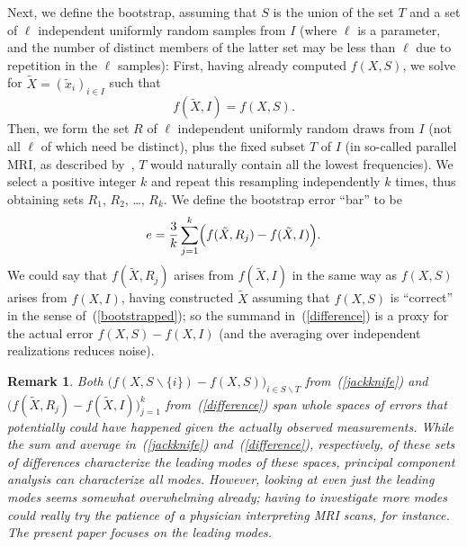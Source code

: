 \documentclass{article}
\newtheorem{remark1}[theorem]{Remark}
\newenvironment{remark}{\begin{remark1} \rm}{\end{remark1}}
\begin{document}
Next, we define the bootstrap, assuming that $S$ is the union of the set $T$
and a set of $\ell$ independent uniformly random samples from $I$
(where $\ell$ is a parameter, and the number of distinct members
of the latter set may be less than $\ell$ due to repetition
in the $\ell$ samples):
First, having already computed $f(X, S)$,
we solve for $\tilde{X} = (\tilde{x}_i)_{i \in I}$ such that
%
\begin{equation}
\label{bootstrapped}
f(\tilde{X}, I) = f(X, S).
\end{equation}
%
Then, we form the set $R$ of $\ell$ independent uniformly random draws from $I$
(not all $\ell$ of which need be distinct),
plus the fixed subset $T$ of $I$ (in so-called parallel MRI,
as described by~\cite{brown-cheng-haacke-thompson-venkatesan},
$T$ would naturally contain all the lowest frequencies).
We select a positive integer $k$ and repeat this resampling independently
$k$ times, thus obtaining sets $R_1$, $R_2$, \dots, $R_k$.
We define the bootstrap error ``bar'' to be
%
\begin{equation}
\label{difference}
e = \frac{3}{k} \sum_{j = 1}^k
    \Bigl( f(\tilde{X}, R_j) - f(\tilde{X}, I) \Bigr).
\end{equation}
%
We could say that $f(\tilde{X}, R_j)$ arises from $f(\tilde{X}, I)$
in the same way as $f(X, S)$ arises from $f(X, I)$,
having constructed $\tilde{X}$ assuming that $f(X, S)$ is ``correct''
in the sense of~(\ref{bootstrapped}); so the summand in~(\ref{difference})
is a proxy for the actual error $f(X, S) - f(X, I)$
(and the averaging over independent realizations reduces noise).

\begin{remark}
Both $\bigl( f(X, S \backslash \{i\}) - f(X, S) \bigr)_{i \in S \backslash T}$
from~(\ref{jackknife})
and $\bigl( f(\tilde{X}, R_j) - f(\tilde{X}, I) \bigr)_{j = 1}^k$
from~(\ref{difference})
span whole spaces of errors that potentially could have happened
given the actually observed measurements.
While the sum and average in~(\ref{jackknife}) and~(\ref{difference}),
respectively, of these sets of differences characterize the leading modes
of these spaces, principal component analysis can characterize all modes.
However, looking at even just the leading modes seems somewhat overwhelming
already; having to investigate more modes could really try the patience
of a physician interpreting MRI scans, for instance.
The present paper focuses on the leading modes.
\end{remark}
\end{document}

